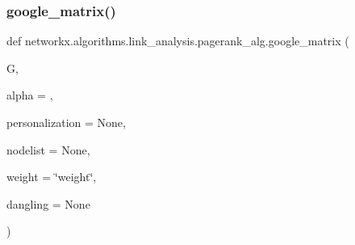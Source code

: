 \subsubsection{\texorpdfstring{google\+\_\+matrix()}{google\_matrix()}}
{\footnotesize\ttfamily def networkx.\+algorithms.\+link\+\_\+analysis.\+pagerank\+\_\+alg.\+google\+\_\+matrix (\begin{DoxyParamCaption}\item[{}]{G,  }\item[{}]{alpha = {},  }\item[{}]{personalization = {\ttfamily None},  }\item[{}]{nodelist = {\ttfamily None},  }\item[{}]{weight = {\ttfamily \char`\"{}weight\char`\"{}},  }\item[{}]{dangling = {\ttfamily None} }\end{DoxyParamCaption})}

